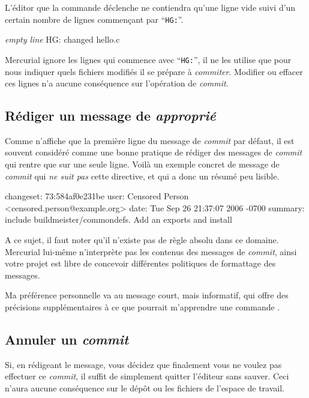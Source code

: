 L'éditor que la commande  déclenche ne contiendra
qu'une ligne vide suivi d'un certain nombre de lignes commençant
par ``\texttt{HG:}''.
\begin{codesample2}
  \emph{empty line}
  HG: changed hello.c
\end{codesample2}
Mercurial ignore les lignes qui commence avec ``\texttt{HG:}'', il 
ne les utilise que pour nous indiquer quels fichiers modifiés il se 
prépare à \textit{commiter}. Modifier ou effacer ces lignes n'a 
aucune conséquence sur l'opération de \textit{commit}.

\subsection{Rédiger un message de \textit{approprié}}

Comme  n'affiche que la première ligne du message de
\textit{commit} par défaut, il est souvent considéré comme une bonne
pratique de rédiger des messages de \textit{commit} qui rentre que 
sur une seule ligne. Voilà un exemple concret de message de 
\textit{commit} qui \emph{ne suit pas} cette directive, et qui a donc
un résumé peu lisible.
\begin{codesample2}
  changeset:   73:584af0e231be
  user:        Censored Person <censored.person@example.org>
  date:        Tue Sep 26 21:37:07 2006 -0700
  summary:     include buildmeister/commondefs.   Add an exports and install
\end{codesample2}

A ce sujet, il faut noter qu'il n'existe pas de règle absolu dans ce 
domaine. Mercurial lui-même n'interprète pas les contenus des messages
de \textit{commit}, ainsi votre projet est libre de concevoir différentes
politiques de formattage des messages.

Ma préférence personnelle va au message court, mais informatif, qui offre
des précisions supplémentaires à ce que pourrait m'apprendre une commande
.

\subsection{Annuler un \textit{commit}}

Si, en rédigeant le message, vous décidez que finalement vous ne 
voulez pas effectuer ce \textit{commit}, il suffit de simplement quitter
l'éditeur sans sauver. Ceci n'aura aucune conséquence sur le dépôt ou
les fichiers de l'espace de travail.

